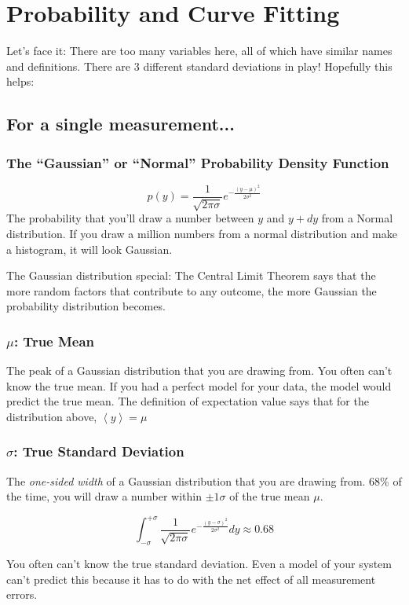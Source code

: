 \documentclass[12pt]{article}
\begin{document}
\section*{Probability and Curve Fitting}

Let's face it: There are too many variables here, all of which have similar names and definitions. There are 3 different standard deviations in play! Hopefully this helps:

\subsection*{For a single measurement...}

\subsubsection*{The ``Gaussian'' or ``Normal'' Probability Density Function}
\[
p(y) = \frac{1}{\sqrt{2 \pi \sigma}} e^{-\frac{(y-\mu)^2}{2\sigma^2}}
\]
The probability that you'll draw a number between $y$ and $y+dy$ from a Normal distribution. If you draw a million numbers from a normal distribution and make a histogram, it will look Gaussian.

The Gaussian distribution special: The Central Limit Theorem says that the more random factors that contribute to any outcome, the more Gaussian the probability distribution becomes.

\subsubsection*{$\mu$: True Mean} The peak of a Gaussian distribution that you are drawing from. You often can't know the true mean. If you had a perfect model for your data, the model would predict the true mean. The definition of expectation value says that for the distribution above, $\left< y \right> = \mu$

\subsubsection*{$\sigma$: True Standard Deviation} The \textit{one-sided width} of a Gaussian distribution that you are drawing from. 68\% of the time, you will draw a number within $\pm1\sigma$ of the true mean $\mu$.

\[
\int_{-\sigma}^{+\sigma} \frac{1}{\sqrt{2 \pi \sigma}} e^{-\frac{(y-\sigma)^2}{2\sigma^2}} dy \approx 0.68
\]

You often can't know the true standard deviation. Even a model of your system can't predict this because it has to do with the net effect of all measurement errors.
\end{document}
